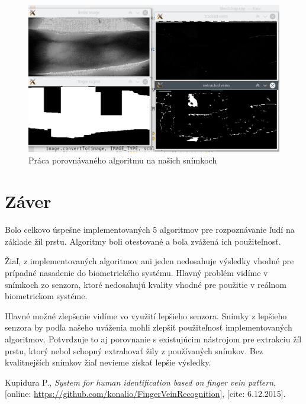 \documentclass[11pt,a4paper]{article}
\begin{document}
\begin{landscape}
\begin{figure}[ht!]
	\centering
	\includegraphics[width=27cm]{fig/test_nas.eps}
	\caption{\label{fig:test_nas} Práca porovnávaného algoritmu na našich snímkoch}
\end{figure}
\end{landscape}

\clearpage
\section{Záver} \label{zaver}

Bolo celkovo úspešne implementovaných 5 algoritmov pre rozpoznávanie ľudí na
základe žíl prstu. Algoritmy boli otestované a bola zvážená ich použiteľnosť.

Žiaľ, z implementovaných algoritmov ani jeden nedosahuje výsledky vhodné pre
prípadné nasadenie do biometrického systému. Hlavný problém vidíme v snímkoch zo
senzora, ktoré nedosahujú kvality vhodné pre použitie v reálnom biometrickom
systéme.

Hlavné možné zlepšenie vidíme vo využití lepšieho senzora. Snímky z lepšieho
senzora by podľa našeho uváženia mohli zlepšiť použiteľnosť implementovaných
algoritmov. Potvrdzuje to aj porovnanie s existujúcim nástrojom pre extrakciu
žíl prstu, ktorý nebol schopný extrahovať žily z používaných snímkov. Bez
kvalitnejších snímkov žiaľ nevieme získať lepšie výsledky.

\clearpage



\begin{thebibliography}{99}

	Kupidura P.,
	\emph{System for human identification based on finger vein pattern},
	[online: \url{https://github.com/konalio/FingerVeinRecognition}],
	[cite: 6.12.2015].

\end{thebibliography}
\end{document}
